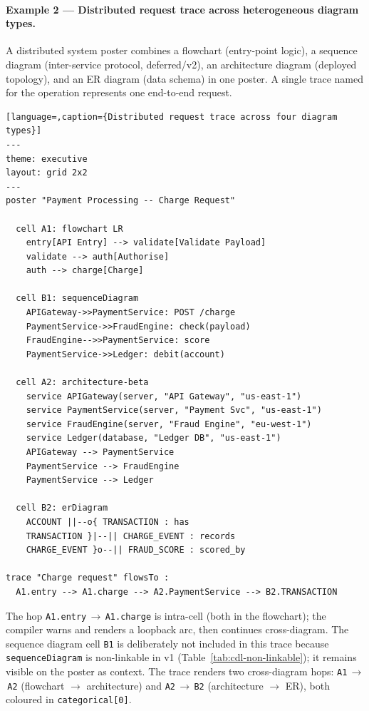 \paragraph{Example 2 --- Distributed request trace across heterogeneous diagram types.}

A distributed system poster combines a flowchart (entry-point logic), a
sequence diagram (inter-service protocol, deferred/v2), an architecture
diagram (deployed topology), and an ER diagram (data schema) in one poster.
A single trace named for the operation represents one end-to-end request.

\begin{lstlisting}[language=,caption={Distributed request trace across four diagram types}]
---
theme: executive
layout: grid 2x2
---
poster "Payment Processing -- Charge Request"

  cell A1: flowchart LR
    entry[API Entry] --> validate[Validate Payload]
    validate --> auth[Authorise]
    auth --> charge[Charge]

  cell B1: sequenceDiagram
    APIGateway->>PaymentService: POST /charge
    PaymentService->>FraudEngine: check(payload)
    FraudEngine-->>PaymentService: score
    PaymentService->>Ledger: debit(account)

  cell A2: architecture-beta
    service APIGateway(server, "API Gateway", "us-east-1")
    service PaymentService(server, "Payment Svc", "us-east-1")
    service FraudEngine(server, "Fraud Engine", "eu-west-1")
    service Ledger(database, "Ledger DB", "us-east-1")
    APIGateway --> PaymentService
    PaymentService --> FraudEngine
    PaymentService --> Ledger

  cell B2: erDiagram
    ACCOUNT ||--o{ TRANSACTION : has
    TRANSACTION }|--|| CHARGE_EVENT : records
    CHARGE_EVENT }o--|| FRAUD_SCORE : scored_by

trace "Charge request" flowsTo :
  A1.entry --> A1.charge --> A2.PaymentService --> B2.TRANSACTION
\end{lstlisting}

The hop \texttt{A1.entry}\,$\to$\,\texttt{A1.charge} is intra-cell (both
in the flowchart); the compiler warns and renders a loopback arc, then
continues cross-diagram.  The sequence diagram cell \texttt{B1} is deliberately
not included in this trace because \texttt{sequenceDiagram} is non-linkable in
v1 (Table~\ref{tab:cdl-non-linkable}); it remains visible on the poster as
context.  The trace renders two cross-diagram hops:
\texttt{A1}\,$\to$\,\texttt{A2} (flowchart $\to$ architecture) and
\texttt{A2}\,$\to$\,\texttt{B2} (architecture $\to$ ER), both coloured in
\texttt{categorical[0]}.

